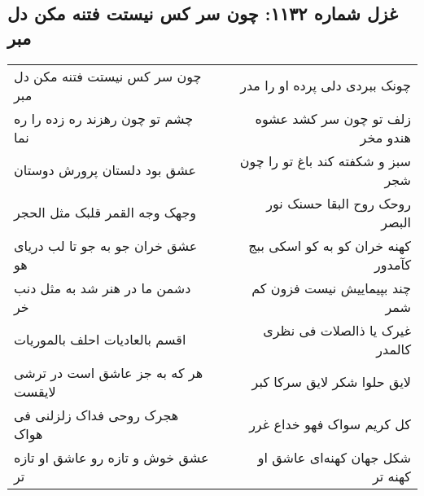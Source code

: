 \begin{center}
\section*{غزل شماره ۱۱۳۲: چون سر کس نیستت فتنه مکن دل مبر}
\label{sec:1132}
\begin{longtable}{l p{0.5cm} r}
چون سر کس نیستت فتنه مکن دل مبر
&&
چونک ببردی دلی پرده او را مدر
\\
چشم تو چون رهزند ره زده را ره نما
&&
زلف تو چون سر کشد عشوه هندو مخر
\\
عشق بود دلستان پرورش دوستان
&&
سبز و شکفته کند باغ تو را چون شجر
\\
وجهک وجه القمر قلبک مثل الحجر
&&
روحک روح البقا حسنک نور البصر
\\
عشق خران جو به جو تا لب دریای هو
&&
کهنه خران کو به کو اسکی ببج کآمدور
\\
دشمن ما در هنر شد به مثل دنب خر
&&
چند بپیماییش نیست فزون کم شمر
\\
اقسم بالعادیات احلف بالموریات
&&
غیرک یا ذالصلات فی نظری کالمدر
\\
هر که به جز عاشق است در ترشی لایقست
&&
لایق حلوا شکر لایق سرکا کبر
\\
هجرک روحی فداک زلزلنی فی هواک
&&
کل کریم سواک فهو خداع غرر
\\
عشق خوش و تازه رو عاشق او تازه تر
&&
شکل جهان کهنه‌ای عاشق او کهنه تر
\\
\end{longtable}
\end{center}

